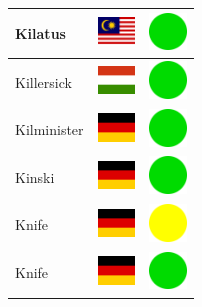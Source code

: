 \documentclass[12pt, a4paper, twoside]{report}
\begin{document}
\begin{center}
\begin{longtable}{|p{5cm}|p{2cm}|p{2cm}|}
 Kilatus                                                    & \includegraphics[width=1cm]{../img/flags/my} &   \includegraphics[width=1cm]{../likes/y} \\ \hline
 Killersick                                                 & \includegraphics[width=1cm]{../img/flags/hu} &   \includegraphics[width=1cm]{../likes/y} \\ \hline
 Kilminister                                                & \includegraphics[width=1cm]{../img/flags/de} &   \includegraphics[width=1cm]{../likes/y} \\ \hline
 Kinski                                                     & \includegraphics[width=1cm]{../img/flags/de} &   \includegraphics[width=1cm]{../likes/y} \\ \hline
 Knife                                                      & \includegraphics[width=1cm]{../img/flags/de} &   \includegraphics[width=1cm]{../likes/m} \\ \hline
 Knife                                                      & \includegraphics[width=1cm]{../img/flags/de} &   \includegraphics[width=1cm]{../likes/y} \\ \hline

\end{longtable}
\end{center}
\end{document}
